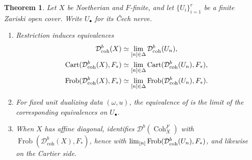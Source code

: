 \documentclass[11pt]{amsart}
\newcommand{\Cart}{\operatorname{Cart}}
\renewcommand{\lim}{\operatornamewithlimits{\rm{lim}}}
\newcommand{\Coh}{\operatorname{{Coh}}}
\newcommand{\Frob}{\operatorname{Frob}}
\newcommand{\Dbc}{\mathcal D^b_{\mathrm{coh}}}
\newcommand{\Db}{\mathcal D^b}
\theoremstyle{plain}
\newtheorem{theorem}[theorem]{Theorem}
\theoremstyle{definition}
\numberwithin{equation}{section}
\begin{document}
\begin{theorem}\label{thm:descent}
Let $X$ be Noetherian and $F$-finite, and let $\{U_i\}_{i=1}^r$ be a finite Zariski open cover.
Write $U_\bullet$ for its \v Cech nerve.
\begin{enumerate}
\item
Restriction induces equivalences
\begin{align*}
 \Dbc(X)&\simeq\lim_{[n]\in\Delta}\Dbc(U_n),\\
 \Cart(\Dbc(X),F_*)&\simeq
       \lim_{[n]\in\Delta}\Cart(\Dbc(U_n),F_*),\\
 \Frob(\Dbc(X),F_*)&\simeq
       \lim_{[n]\in\Delta}\Frob(\Dbc(U_n),F_*).
\end{align*}
\item
For fixed unit dualizing data $(\omega,u)$, the equivalence of  is the limit of the corresponding equivalences on $U_\bullet$.
\item
When $X$ has affine diagonal,  identifies $\Db(\Coh^F_X)$ with $\Frob(\Dbc(X),F_*)$, hence with $\lim_{[n]}\Frob(\Dbc(U_n),F_*)$, and likewise on the Cartier side.
\end{enumerate}
\end{theorem}
\end{document}

